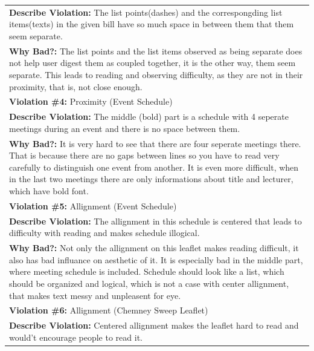 \documentclass[a4paper,11pt,oneside]{scrreprt}
\begin{document}
\begin{tabularx}{\textwidth}{|X|}
		\\
		\textbf{Describe Violation:} The list points(dashes) and the correspongding list items(texts) in the given bill have so much space in between them that them seem separate.
		
		\\
		\textbf{Why Bad?:} The list points and the list items observed as being separate does not help user digest them as coupled together, it is the other way, them seem separate. This leads to reading and observing difficulty, as they are not in their proximity, that is, not close enough.
		
		\\
		\hline	
		
	\textbf{Violation \#4:} Proximity (Event Schedule)
	
	\\
	\textbf{Describe Violation:} The middle (bold) part is a schedule with 4 seperate meetings during an event and there is no space between them.
	
	\\
	\textbf{Why Bad?:} It is very hard to see that there are four seperate meetings there. That is because there are no gaps between lines so you have to read very carefully to distinguish one event from another. It is even more difficult, when in the last two meetings there are only informations about title and lecturer, which have bold font.
	
	\\
	\hline	
	
	\textbf{Violation \#5:} Allignment (Event Schedule)
	
	\\
	\textbf{Describe Violation:} The allignment in this schedule is centered that leads to difficulty with reading and makes schedule illogical. 
	
	\\
	\textbf{Why Bad?:} Not only the allignment on this leaflet makes reading difficult, it also has bad influance on aesthetic of it. It is especially bad in the middle part, where meeting schedule is included. Schedule should look like a list, which should be organized and logical, which is not a case with center allignment, that makes text messy and unpleasent for eye.
	
	\\
	\hline	
	
	\textbf{Violation \#6:} Allignment (Chemney Sweep Leaflet)
	
	\\
	\textbf{Describe Violation:} Centered allignment makes the leaflet hard to read and would't encourage people to read it.
	

\end{tabularx}
\end{document}
